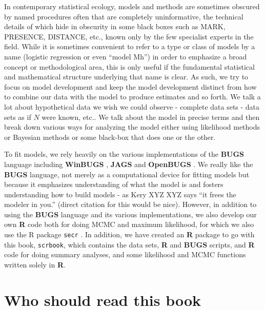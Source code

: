 In contemporary statistical ecology, models and methods are sometimes
obscured by named procedures often that are completely uninformative,
the technical details of which hide in obscurity in some black boxes
such as MARK, PRESENCE, DISTANCE, etc., known only by the few
specialist experts in the field. While it is sometimes convenient to
refer to a type or class of models by a name (logistic regression or
even ``model Mh'') in order to emphasize a broad concept or
methodological area, this is only useful if the fundamental
statistical and mathematical structure underlying that name is
clear. As such, we try to focus on model development and keep the
model development distinct from how to combine our data with the model
to produce estimates and so forth. We talk a lot about hypothetical
data we wish we could observe - complete data sets - data sets as if
$N$ were known, etc.. We talk about the model in precise terms and
then break down various ways for analyzing the model either using
likelihood methods or Bayesian methods or some black-box that does one
or the other.

To fit models, we rely heavily on the various implementations of the
{\bf BUGS} language including {\bf WinBUGS} \citep{lunn_etal:2000},
{\bf JAGS} \citep{plummer:2003}
 and {\bf OpenBUGS} \citep{thomas_etal:2006}. We really like
the {\bf BUGS} language, not merely  as a computational device for
fitting models but because it emphasizes
understanding of what the model is and fosters understanding how to
build models - as Kery XYZ XYZ says ``it frees the modeler in you.''  (direct
citation for this would be nice).  However, in addition to using the
{\bf BUGS} language and its various implementations, we also develop our own
{\bf R} code both for doing MCMC
and maximum likelihood, for which we also use the R
package \mbox{\tt secr} \citep{efford:2011}. In addition, we have
created an {\bf R} package to go with this book, \mbox{\tt scrbook},
which contains the data sets, {\bf R} and {\bf BUGS} scripts, and {\bf
  R} code for doing summary analyses, and some likelihood and MCMC
functions written solely in {\bf R}.


\section*{Who should read this book}

